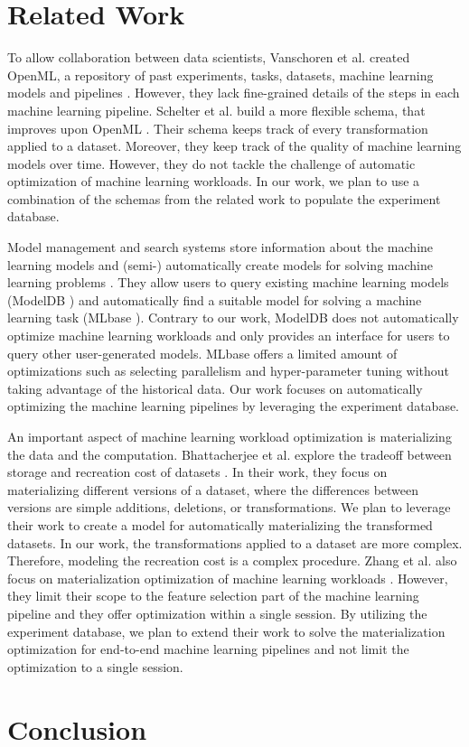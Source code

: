 \documentclass{sig-alternate-05-2015}
\begin{document}
\section{Related Work}\label{sec-related-work}
To allow collaboration between data scientists, Vanschoren et al. created OpenML, a repository of past experiments, tasks, datasets, machine learning models and pipelines \cite{vanschoren2014openml}. 
However, they lack fine-grained details of the steps in each machine learning pipeline.
Schelter et al. build a more flexible schema, that improves upon OpenML \cite{schelterautomatically}. 
Their schema keeps track of every transformation applied to a dataset. 
Moreover, they keep track of the quality of machine learning models over time.
However, they do not tackle the challenge of automatic optimization of machine learning workloads.
In our work, we plan to use a combination of the schemas from the related work to populate the experiment database.

Model management and search systems store information about the machine learning models and (semi-) automatically create models for solving machine learning problems  \cite{vartak2016m, kumar2016model, kraska2013mlbase}.
They allow users to query existing machine learning models (ModelDB \cite{vartak2016m}) and automatically find a suitable model for solving a machine learning task (MLbase \cite{kraska2013mlbase}).
Contrary to our work, ModelDB does not automatically optimize machine learning workloads and only provides an interface for users to query other user-generated models.
MLbase offers a limited amount of optimizations such as selecting parallelism and hyper-parameter tuning without taking advantage of the historical data.
Our work focuses on automatically optimizing the machine learning pipelines by leveraging the experiment database. 

An important aspect of machine learning workload optimization is materializing the data and the computation.
Bhattacherjee et al.  explore the tradeoff between storage and recreation cost of datasets \cite{bhattacherjee2015principles}.
In their work, they focus on materializing different versions of a dataset, where the differences between versions are simple additions, deletions, or transformations. 
We plan to leverage their work to create a model for automatically materializing the transformed datasets.
In our work, the transformations applied to a dataset are more complex.
Therefore, modeling the recreation cost is a complex procedure.
Zhang et al. also focus on materialization optimization of machine learning workloads \cite{zhang2016materialization}.
However, they limit their scope to the feature selection part of the machine learning pipeline and they offer optimization within a single session.
By utilizing the experiment database, we plan to extend their work to solve the materialization optimization for end-to-end machine learning pipelines and not limit the optimization to a single session.

\section{Conclusion}\label{conclusion}




\end{document}
